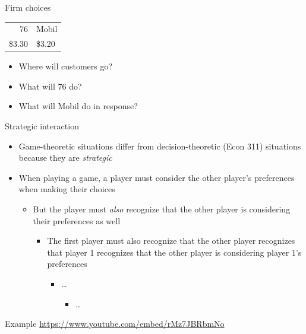 \documentclass[10pt]{beamer}
\begin{document}
\begin{frame}[label={sec:org55489b5}]{}
\alert{Firm choices}
\begin{center}
\begin{tabular}{rl}
76 & Mobil\\
\$3.30 & \$3.20\\
\end{tabular}
\end{center}
\begin{itemize}
\item Where will customers go?
\item What will 76 do?
\item What will Mobil do in response?
\end{itemize}
\end{frame}

\begin{frame}[label={sec:orgdded69e}]{}
\alert{Strategic interaction}
\begin{itemize}
\item Game-theoretic situations differ from decision-theoretic (Econ 311) situations because they are \emph{strategic}
\item When playing a game, a player must consider the other player's preferences when making their choices
\begin{itemize}
\item But the player must \emph{also} recognize that the other player is considering their preferences as well
\begin{itemize}
\item The first player must also recognize that the other player recognizes that player 1 recognizes that the other player is considering player 1's preferences
\begin{itemize}
\item \ldots{}
\begin{itemize}
\item \ldots{}
\end{itemize}
\end{itemize}
\end{itemize}
\end{itemize}
\end{itemize}
\end{frame}

\begin{frame}[label={sec:org8d46ce8}]{}
\alert{Example}
\href{https://www.youtube.com/embed/rMz7JBRbmNo}{https://www.youtube.com/embed/rMz7JBRbmNo}
\end{frame}
\end{document}
